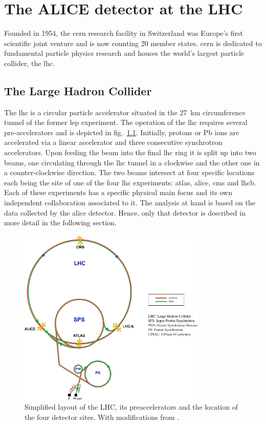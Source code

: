 \chapter{The ALICE detector at the LHC}
\label{chap:alice}
Founded in 1954, the \gls{cern} research facility in Switzerland was Europe's first scientific joint venture and is now counting 20 member states. \gls{cern} is dedicated to fundamental particle physics research and houses the world's largest particle collider, the \gls{lhc}. 
\section{The Large Hadron Collider}
The \gls{lhc} is a circular particle accelerator situated in the \SI{27}{\km} circumference tunnel of the former \gls{lep} experiment. The operation of the \gls{lhc} requires several pre-accelerators and is depicted in fig.~\ref{fig:lhc_layout}. Initially, protons or Pb ions are accelerated via a linear accelerator and three consecutive synchrotron accelerators. Upon feeding the beam into the final \gls{lhc} ring it is split up into two beams, one circulating through the \gls{lhc} tunnel in a clockwise and the other one in a counter-clockwise direction. The two beams intersect at four specific locations each being the site of one of the four \gls{lhc} experiments: \gls{atlas}, \gls{alice}, \gls{cms} and \gls{lhcb}. Each of these experiments has a specific physical main focus and its own independent collaboration associated to it. The analysis at hand is based on the data collected by the \gls{alice} detector. Hence, only that detector is described in more detail in the following section.
\begin{figure}
  \centering
  \includegraphics[width=0.8\textwidth]{figures/accelerators_mod}
  \caption[Simplified layout of the LHC, its preaccelerators and the location of the four detector sites.]{Simplified layout of the LHC, its preaccelerators and the location of the four detector sites. With modifications from \cite{Manglunki2001}.}
  \label{fig:lhc_layout}
\end{figure}

